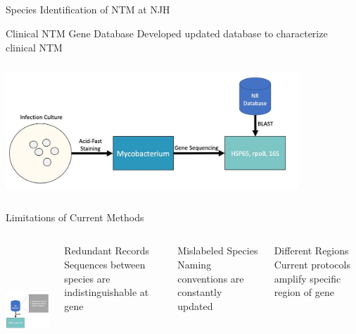\documentclass[11pt]{beamer}
\begin{document}
\subsection{}
	\begin{frame}{Species Identification of NTM at NJH}
  \begin{block}{Clinical NTM Gene Database}
  Developed updated database to characterize clinical NTM
  \end{block}
	\includegraphics[height=5cm, width=11cm]{CPBS_11_18/NJH_Protocol.jpg}
	
	\end{frame}
	\begin{frame}{Limitations of Current Methods}
	
	\begin{columns}
	\includegraphics[height=5cm, width=5.5cm]{CPBS_11_18/Issues.jpg}
	\begin{block}{Redundant Records}
	Sequences between species are indistinguishable at gene
	\end{block}
	\begin{block}{Mislabeled Species}
	Naming conventions are constantly updated
	\end{block}
	\begin{block}{Different Regions}
	Current protocols amplify specific region of gene
	\end{block}
	\end{columns}
	
	\end{frame}
\end{document}
